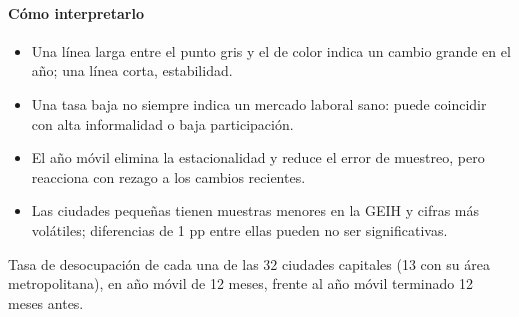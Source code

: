 \paragraph{Cómo interpretarlo}
\begin{itemize}
\item Una línea larga entre el punto gris y el de color indica un cambio grande en el año; una línea corta, estabilidad.
\item Una tasa baja no siempre indica un mercado laboral sano: puede coincidir con alta informalidad o baja participación.
\item El año móvil elimina la estacionalidad y reduce el error de muestreo, pero reacciona con rezago a los cambios recientes.
\item Las ciudades pequeñas tienen muestras menores en la GEIH y cifras más volátiles; diferencias de 1 pp entre ellas pueden no ser significativas.
\end{itemize}
\begin{formulas}[Fórmulas]
\end{formulas}
\begin{metodo}[Metodología]
Tasa de desocupación de cada una de las 32 ciudades capitales (13 con su área metropolitana), en año móvil de 12 meses, frente al año móvil terminado 12 meses antes.
\par{}
\end{metodo}

